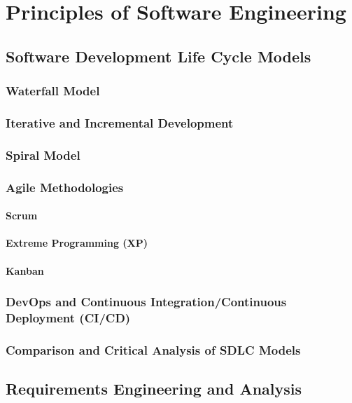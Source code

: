 \chapter{Principles of Software Engineering}
\begin{refsection}

\section{Software Development Life Cycle Models}
\subsection{Waterfall Model}
\subsection{Iterative and Incremental Development}
\subsection{Spiral Model}
\subsection{Agile Methodologies}
\subsubsection{Scrum}
\subsubsection{Extreme Programming (XP)}
\subsubsection{Kanban}
\subsection{DevOps and Continuous Integration/Continuous Deployment (CI/CD)}
\subsection{Comparison and Critical Analysis of SDLC Models}

\newpage

\section{Requirements Engineering and Analysis}

\end{refsection}
